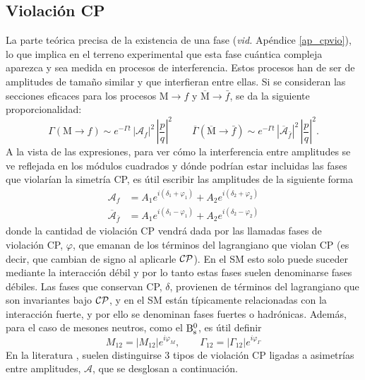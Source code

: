 \subsection{Violación CP} %


\color{vero} La parte teórica \color{norm}  precisa de la existencia de una fase (\emph{vid.} Apéndice \ref{ap_cpvio}), lo que implica en el terreno experimental que esta fase cuántica compleja aparezca y sea medida en procesos de interferencia. Estos procesos han de ser de amplitudes de tamaño similar y que interfieran entre ellas. Si se consideran las secciones eficaces para los procesos $\text{M} \rightarrow f $ y $\overline{\text{M}} \rightarrow \bar f $, se da la siguiente proporcionalidad:
\[\Gamma (\text{M} \rightarrow f )  \sim e^{-\Gamma t} \, |\mathcal{A}_f|^2 \, \left| \frac{p}{q} \right|^2 \qquad	
\overline{\Gamma} (\overline{\text{M}} \rightarrow \bar f )  \sim e^{-\Gamma t} \,  |\overline{\mathcal{A}}_{\bar f}|^2 \, \left| \frac{p}{q} \right|^2.\]
A la vista de las expresiones, para ver cómo la interferencia entre amplitudes se ve reflejada en los módulos cuadrados y dónde podrían estar incluidas las fases que violarían la simetría CP, es útil escribir las amplitudes de la siguiente forma \color{vero}
\begin{equation}
\begin{split}
\mathcal{A}_f & = A_1 e^{i(\delta_1+\varphi_1)}	 + A_2 e^{i(\delta_2+\varphi_2)}	\\
\overline{\mathcal{A}}_{\overline{f}} & = A_1e^{i(\delta_1-\varphi_1)}	 + A_2e^{i(\delta_2-\varphi_2)}	
\end{split}
\end{equation} \color{norm}
donde la cantidad de violación CP vendrá dada por las llamadas fases de violación CP, $\varphi$, que emanan de los términos del lagrangiano que violan CP (es decir, que cambian de signo al aplicarle $\mathcal{CP}$). En el SM esto solo puede suceder mediante la interacción débil  y por lo tanto estas fases suelen denominarse fases débiles.  Las fases que conservan CP, $\delta$, provienen de términos del lagrangiano que son invariantes bajo $\mathcal{CP}$, y en el SM están típicamente relacionadas con la interacción fuerte, y por ello se denominan fases fuertes o hadrónicas.
Además, para el caso de mesones neutros, como el $\text{B}{}_{\text{s}}^{0}$, es útil definir
\begin{equation}
	M_{12} = |M_{12}|e^{i\varphi_M}, \qquad \Gamma_{12} = |\Gamma_{12}|e^{i\varphi_{\Gamma}}
\end{equation}
%
En la literatura \cite{lavoura}, suelen distinguirse 3 tipos de violación CP ligadas a asimetrías entre amplitudes, $\mathscr{A}$, que se desglosan a continuación.



